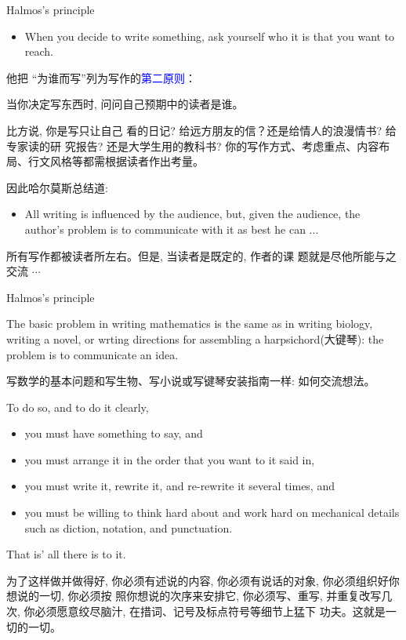\documentclass[10pt]{ctexbeamer}
\newcommand{\blue}[1]{\textcolor{blue}{#1}}
\begin{document}
\begin{frame}{Halmos's principle}

\begin{itemize}
\item When you decide to write something, ask yourself who it is that you want to reach.
\end{itemize}
\pause
 {\small
他把 “为谁而写”列为写作的\blue{第二原则}：
\begin{center}
当你决定写东西时, 问问自己预期中的读者是谁。
\end{center}


 比方说, 你是写只让自己 看的日记? 给远方朋友的信？还是给情人的浪漫情书? 给专家读的研 究报告? 还是大学生用的教科书? 你的写作方式、考虑重点、内容布 局、行文风格等都需根据读者作出考量。

因此哈尔莫斯总结道:}

\begin{itemize}
    \item
All writing is influenced by the audience, but, given the audience, the author's problem is to communicate with it as best he can ...
\end{itemize}
\pause

 {\small
所有写作都被读者所左右。但是, 当读者是既定的, 作者的课 题就是尽他所能与之交流 $\cdots$
}
\end{frame}



\begin{frame}{Halmos's principle}


    {\small  The basic problem in writing mathematics is the same as in writing biology, writing a novel, or wrting directions for assembling a harpsichord(大键琴):     the problem is  to communicate an idea.}

  \pause

{\small  写数学的基本问题和写生物、写小说或写键琴安装指南一样: 如何交流想法。}

\end{frame}

\begin{frame}{}


    {\small To do so, and to do it clearly,
        \begin{itemize}
            \item you must have something to say, and
            \item you must arrange it in the order that you want to it said in,
            \item you must write it, rewrite it, and re-rewrite it  several times, and
            \item you must be willing to think hard about and work hard on mechanical details such as diction, notation, and punctuation.
        \end{itemize}
        That is' all there is to it.}

    \pause

    {\small 为了这样做并做得好, 你必须有述说的内容, 你必须有说话的对象, 你必须组织好你想说的一切, 你必须按 照你想说的次序来安排它, 你必须写、重写, 并重复改写几次, 你必须愿意绞尽脑汁, 在措词、记号及标点符号等细节上猛下 功夫。这就是一切的一切。 }
\end{frame}
\end{document}
